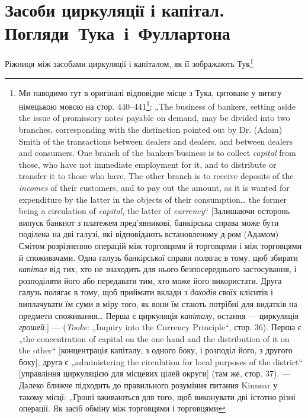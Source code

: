 
\section{Засоби циркуляції і капітал.
Погляди~Тука~і~Фуллартона}

Ріжниця між засобами циркуляції і капіталом, як її зображають Тук\footnote{Ми наводимо тут в оригіналі відповідне місце з Тука, цитоване у витягу
німецькою мовою на стор. 440--441\footnote*{Сторінки за німецьким виданням ІМЕЛ; в цьому українському виданні
відповідне місце цитується на стор. 385. \emph{Ред. укр. перекладу.}}: „The business of bankers, setting aside the
issue of promissory notes payable on demand, may be divided into two branches,
corresponding with the distinction pointed out by Dr. (Adam) Smith of the transactions between
dealers and dealers, and between dealers and consumers. One branch
of the bankers’business is to collect \emph{capital} from those, who have not immediate
employment for it, and to distribute or transfer it to those who have. The other
branch is to receive deposits of the \emph{incomes} of their customers, and to pay out
the amount, as it is wanted for expenditure by the latter in the objects of their
consumption\dots{} the former being a circulation of \emph{capital}, the latter of \emph{currency}“ [Залишаючи
осторонь випуск банкнот з платежем пред’явникові, банкірська справа
може бути поділена на дві галузі, які відповідають встановленому д-ром (Адамом)
Смітом розрізненню операцій між торговцями й торговцями і між торговцями й
споживачами. Одна галузь банкірської справи полягає в тому, щоб збирати
\emph{капітал} від тих, хто не знаходить для нього безпосереднього застосування,
і розподіляти його або передавати тим, хто може його використати. Друга галузь
полягає в тому, щоб приймати вклади з \emph{доходів} своїх клієнтів і виплачувати їм
суми в міру того, як вони їм стають потрібні для видатків на предмети споживання\dots{} Перша є
циркуляція \emph{капіталу}, остання — циркуляція \emph{грошей}.] —
(\emph{Tooke}: „Inquiry into the Currency Principle“, стор. 36). Перша є „the concentration of capital on
the one hand and the distribution of it on the other“ [концентрація
капіталу, з одного боку, і розподіл його, з другого боку], друга є „administering
the circulation for local purposes of the district“ [управління циркуляцією для
місцевих цілей округи] (там же, стор. 37). — Далеко ближче підходить до
правильного розуміння питання Kinnear у такому місці: „Гроші вживаються
для того, щоб виконувати дві істотно різні операції. Як засіб обміну між торговцями і торговцями
}
